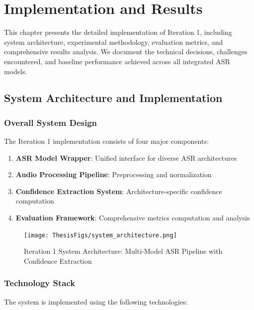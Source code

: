 \chapter{Implementation and Results}
\label{sec:implementation}

This chapter presents the detailed implementation of Iteration 1, including system architecture, experimental methodology, evaluation metrics, and comprehensive results analysis. We document the technical decisions, challenges encountered, and baseline performance achieved across all integrated ASR models.

\section{System Architecture and Implementation}

\subsection{Overall System Design}

The Iteration 1 implementation consists of four major components:

\begin{enumerate}
    \item \textbf{ASR Model Wrapper}: Unified interface for diverse ASR architectures
    \item \textbf{Audio Processing Pipeline}: Preprocessing and normalization
    \item \textbf{Confidence Extraction System}: Architecture-specific confidence computation
    \item \textbf{Evaluation Framework}: Comprehensive metrics computation and analysis
\end{enumerate}

\begin{figure}[H]
    \centering
    \texttt{[image: ThesisFigs/system\_architecture.png]}
    \caption{Iteration 1 System Architecture: Multi-Model ASR Pipeline with Confidence Extraction}
    \label{fig:system_arch}
\end{figure}

\subsection{Technology Stack}

The system is implemented using the following technologies:

